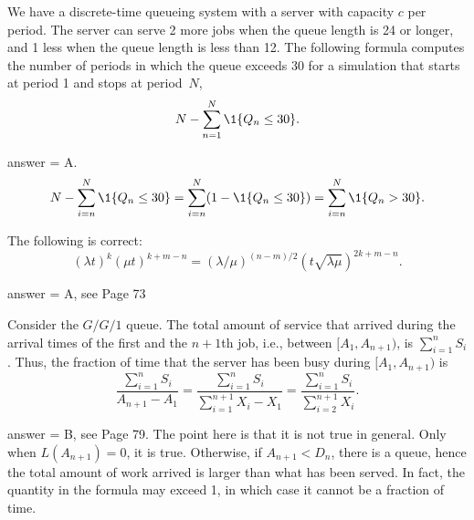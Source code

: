 \begin{exercise}[201804]
We have a discrete-time queueing system with a server with capacity $c$ per period. The server can serve 2 more jobs
when the queue length is 24 or longer, and  1 less when the queue length is less than 12.  
The following formula computes the number of periods in which the queue exceeds 30 for a simulation that starts at period 1 and stops at period~$N$, 
\begin{equation*}
N-  \sum_{n=1}^N \1{Q_n \leq 30}.
\end{equation*}
\begin{solution}
answer = A. 
\begin{equation*}
N-  \sum_{i=n}^N \1{Q_n \leq 30} = 
\sum_{i=n}^N (1-\1{Q_n \leq 30}) = 
\sum_{i=n}^N \1{Q_n > 30}.
\end{equation*}
\end{solution}
\end{exercise}

\begin{exercise}[201804]
The following is correct: 
\begin{equation*}
  (\lambda t)^k (\mu t) ^{k + m - n}  
= (\lambda/\mu)^{(n-m)/2} (t\sqrt{\lambda \mu})^{2k+m-n}.
\end{equation*}
\begin{solution}
answer = A, see Page 73
\end{solution}
\end{exercise}

\begin{exercise}[201804] Consider the $G/G/1$ queue.  The total amount of service that arrived during the arrival times of the first and the $n+1$th job, i.e., between $[A_1, A_{n+1})$, is $\sum_{i=1}^n S_i$.
Thus,  the     fraction of time that the server has been busy during $[A_1, A_{n+1})$    is
        \begin{equation*}
\frac{\sum_{i=1}^n S_i}{A_{n+1}-A_1} 
=          \frac{\sum_{i=1}^n S_i}{\sum_{i=1}^{n+1}X_i -X_1} 
=          \frac{\sum_{i=1}^n S_i}{\sum_{i=2}^{n+1}X_i}.
        \end{equation*}
\begin{solution}
answer = B, see Page 79. The point here is that it is not true in general. Only when $L(A_{n+1})=0$, it is true. Otherwise, if $A_{n+1}< D_n$, there is a queue, hence the total amount of work arrived is larger than what has been served. In fact, the quantity in the formula may exceed 1, in which case it cannot be a fraction of time.
\end{solution}
\end{exercise}

